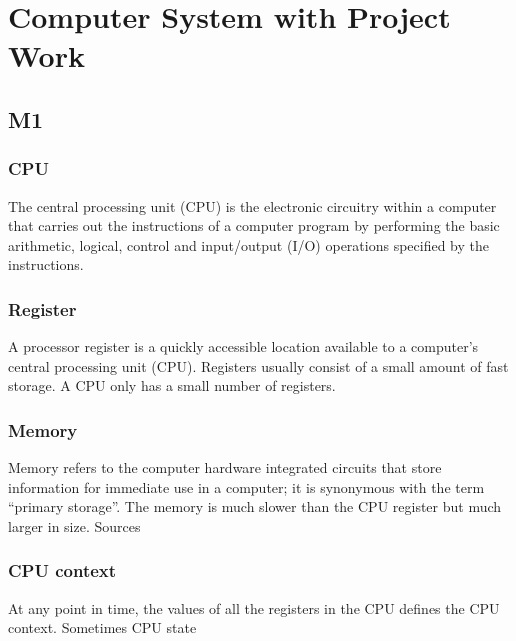 \chapter{Computer System with Project Work}

\newpage

\section{M1}
\subsection{CPU}
The central processing unit (CPU) is the electronic circuitry within a
computer that carries out the instructions of a computer program by
performing the basic arithmetic, logical, control and input/output (I/O)
operations specified by the instructions.

\subsection{Register}
A processor register is a quickly accessible location available to a
computer’s central processing unit (CPU). Registers usually consist of
a small amount of fast storage. A CPU only has a small number of
registers.

\subsection{Memory}
Memory refers to the computer hardware integrated circuits that store
information for immediate use in a computer; it is synonymous with the
term “primary storage”. The memory is much slower than the CPU
register but much larger in size.
Sources

\subsection{CPU context}
At any point in time, the values of all
the registers in the CPU defines the
CPU context. Sometimes CPU state

